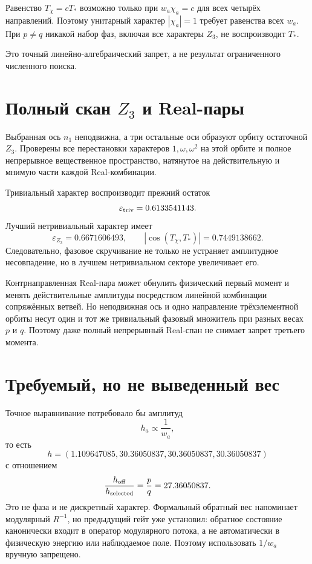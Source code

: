 \begin{theorem}
Равенство $T_\chi=cT_*$ возможно только при
$w_a\chi_a=c$ для всех четырёх направлений. Поэтому унитарный характер
$|\chi_a|=1$ требует равенства всех $w_a$. При $p\ne q$ никакой набор
фаз, включая все характеры $Z_3$, не воспроизводит $T_*$.
\end{theorem}

Это точный линейно-алгебраический запрет, а не результат ограниченного
численного поиска.

\section{Полный скан \texorpdfstring{$Z_3$}{Z3} и Real-пары}

Выбранная ось $n_1$ неподвижна, а три остальные оси образуют орбиту
остаточной $Z_3$. Проверены все перестановки характеров
$1,\omega,\omega^2$ на этой орбите и полное непрерывное вещественное
пространство, натянутое на действительную и мнимую части каждой
Real-комбинации.

Тривиальный характер воспроизводит прежний остаток
\begin{equation}
 \varepsilon_{\rm triv}=0.6133541143.
\end{equation}
Лучший нетривиальный характер имеет
\begin{equation}
 \varepsilon_{Z_3}=0.6671606493,
 \qquad
 |\cos(T_\chi,T_*)|=0.7449138662.
\end{equation}
Следовательно, фазовое скручивание не только не устраняет амплитудное
несовпадение, но в лучшем нетривиальном секторе увеличивает его.

Контрнаправленная Real-пара может обнулить физический первый момент и
менять действительные амплитуды посредством линейной комбинации
сопряжённых ветвей. Но неподвижная ось и одно направление трёхэлементной
орбиты несут один и тот же тривиальный фазовый множитель при разных весах
$p$ и $q$. Поэтому даже полный непрерывный Real-спан не снимает запрет
третьего момента.

\section{Требуемый, но не выведенный вес}

Точное выравнивание потребовало бы амплитуд
\begin{equation}
 h_a\propto\frac1{w_a},
\end{equation}
то есть
\begin{equation}
 h=(1.109647085,
 30.36050837,
 30.36050837,
 30.36050837)
\end{equation}
с отношением
\begin{equation}
 \frac{h_{\rm off}}{h_{\rm selected}}
 =\frac pq=27.36050837.
\end{equation}
Это не фаза и не дискретный характер. Формальный обратный вес напоминает
модулярный $R^{-1}$, но предыдущий гейт уже установил: обратное состояние
канонически входит в оператор модулярного потока, а не автоматически в
физическую энергию или наблюдаемое поле. Поэтому использовать $1/w_a$
вручную запрещено.

